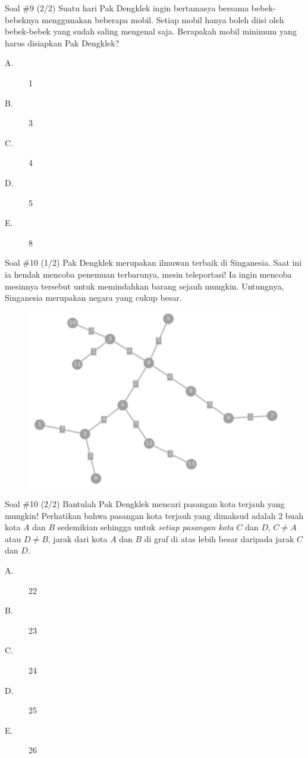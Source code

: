 \documentclass[english,t]{beamer}
\begin{document}
	\begin{frame}{Soal \#9 (2/2)}
		Suatu hari Pak Dengklek ingin bertamasya bersama bebek-bebeknya menggunakan beberapa mobil. Setiap mobil hanya boleh diisi oleh bebek-bebek yang sudah saling mengenal saja. Berapakah mobil minimum yang harus disiapkan Pak Dengklek?
		\begin{description}
			\item[A.] 1
			\item[B.] 3
			\item[C.] 4
			\item[D.] 5
			\item[E.] 8
		\end{description}		
	\end{frame}

	\begin{frame}{Soal \#10 (1/2)}
		Pak Dengklek merupakan ilmuwan terbaik di Singanesia. Saat ini ia hendak mencoba penemuan terbarunya, mesin teleportasi! Ia ingin mencoba mesinnya tersebut untuk memindahkan barang sejauh mungkin. Untungnya, Singanesia merupakan negara yang cukup besar.
		\begin{figure}[!ht]
			\centering
			\includegraphics[scale=.1675]{images/singanesia}
		\end{figure}

	\end{frame}
	
\begin{frame}{Soal \#10 (2/2)}
	Bantulah Pak Dengklek mencari pasangan kota terjauh yang mungkin! Perhatikan bahwa pasangan kota terjauh yang dimaksud adalah 
	2 buah kota $A$ dan $B$ sedemikian sehingga untuk \textit{setiap pasangan kota} $C$ dan $D$, $C \neq A$ atau $D \neq B$, jarak dari kota $A$ dan $B$ di graf di atas lebih besar daripada jarak $C$ dan $D$.
		\begin{description}
	\item[A.] 22
	\item[B.] 23
	\item[C.] 24
	\item[D.] 25
	\item[E.] 26
\end{description}		
\end{frame}
\end{document}
